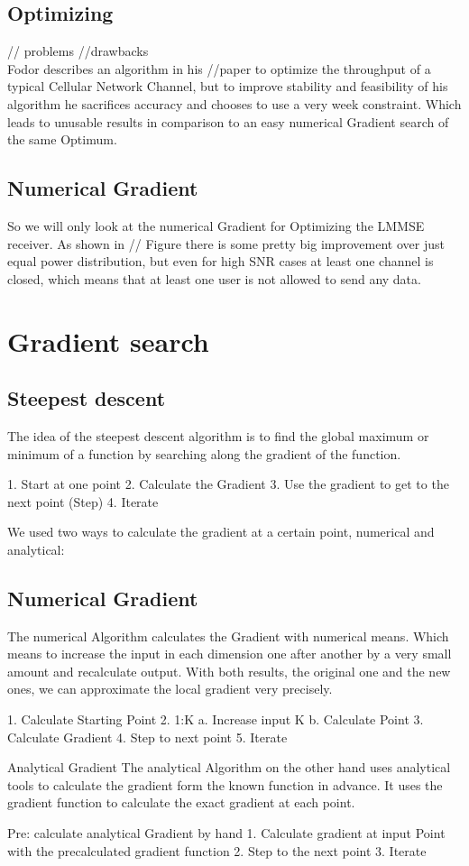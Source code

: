 \section{Optimizing}
// problems //drawbacks\\
Fodor describes an algorithm in his //paper to optimize the throughput of a typical Cellular Network Channel, but to improve stability and feasibility of his algorithm he sacrifices accuracy and chooses to use a very week constraint. Which leads to unusable results in comparison to an easy numerical Gradient search of the same Optimum.

\section{Numerical Gradient}
So we will only look at the numerical Gradient for Optimizing the LMMSE receiver. As shown in // Figure there is some pretty big improvement over just equal power distribution, but even for high SNR cases at least one channel is closed, which means that at least one user is not allowed to send any data.


\chapter{Gradient search}
\section{Steepest descent}
The idea of the steepest descent algorithm is to find the global maximum or minimum of a function by searching along the gradient of the function.
\begin{algorithm}
	1.	Start at one point
	2.	Calculate the Gradient
	3.	Use the gradient to get to the next point (Step)
	4.	Iterate
\end{algorithm}
We used two ways to calculate the gradient at a certain point, numerical and analytical:

\section{Numerical Gradient}
The numerical Algorithm calculates the Gradient with numerical means. Which means to increase the input in each dimension one after another by a very small amount and recalculate output. With both results, the original one and the new ones, we can approximate the local gradient very precisely.
\begin{algorithm}
	1.	Calculate Starting Point
	2.	1:K 
	a.	Increase input K
	b.	Calculate Point
	3.	Calculate Gradient
	4.	Step to next point
	5.	Iterate
\end{algorithm}
Analytical Gradient
The analytical Algorithm on the other hand uses analytical tools to calculate the gradient form the known function in advance. It uses the gradient function to calculate the exact gradient at each point.
\begin{algorithm}
	Pre: calculate analytical Gradient by hand
	1.	Calculate gradient at input Point with the precalculated gradient function
	2.	Step to the next point
	3.	Iterate
\end{algorithm}

